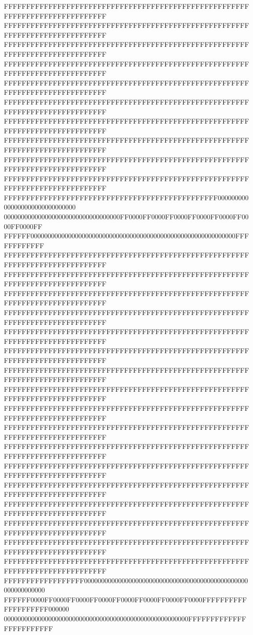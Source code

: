 FFFFFFFFFFFFFFFFFFFFFFFFFFFFFFFFFFFFFFFFFFFFFFFFFFFFFFFFFFFFFFFFFFFFFFFFFFFFFF
FFFFFFFFFFFFFFFFFFFFFFFFFFFFFFFFFFFFFFFFFFFFFFFFFFFFFFFFFFFFFFFFFFFFFFFFFFFFFF
FFFFFFFFFFFFFFFFFFFFFFFFFFFFFFFFFFFFFFFFFFFFFFFFFFFFFFFFFFFFFFFFFFFFFFFFFFFFFF
FFFFFFFFFFFFFFFFFFFFFFFFFFFFFFFFFFFFFFFFFFFFFFFFFFFFFFFFFFFFFFFFFFFFFFFFFFFFFF
FFFFFFFFFFFFFFFFFFFFFFFFFFFFFFFFFFFFFFFFFFFFFFFFFFFFFFFFFFFFFFFFFFFFFFFFFFFFFF
FFFFFFFFFFFFFFFFFFFFFFFFFFFFFFFFFFFFFFFFFFFFFFFFFFFFFFFFFFFFFFFFFFFFFFFFFFFFFF
FFFFFFFFFFFFFFFFFFFFFFFFFFFFFFFFFFFFFFFFFFFFFFFFFFFFFFFFFFFFFFFFFFFFFFFFFFFFFF
FFFFFFFFFFFFFFFFFFFFFFFFFFFFFFFFFFFFFFFFFFFFFFFFFFFFFFFFFFFFFFFFFFFFFFFFFFFFFF
FFFFFFFFFFFFFFFFFFFFFFFFFFFFFFFFFFFFFFFFFFFFFFFFFFFFFFFFFFFFFFFFFFFFFFFFFFFFFF
FFFFFFFFFFFFFFFFFFFFFFFFFFFFFFFFFFFFFFFFFFFFFFFFFFFFFFFFFFFFFFFFFFFFFFFFFFFFFF
FFFFFFFFFFFFFFFFFFFFFFFFFFFFFFFFFFFFFFFFFFFFFFFF000000000000000000000000000000
0000000000000000000000000000000000FF0000FF0000FF0000FF0000FF0000FF0000FF0000FF
FFFFFF000000000000000000000000000000000000000000000000000000000000FFFFFFFFFFFF
FFFFFFFFFFFFFFFFFFFFFFFFFFFFFFFFFFFFFFFFFFFFFFFFFFFFFFFFFFFFFFFFFFFFFFFFFFFFFF
FFFFFFFFFFFFFFFFFFFFFFFFFFFFFFFFFFFFFFFFFFFFFFFFFFFFFFFFFFFFFFFFFFFFFFFFFFFFFF
FFFFFFFFFFFFFFFFFFFFFFFFFFFFFFFFFFFFFFFFFFFFFFFFFFFFFFFFFFFFFFFFFFFFFFFFFFFFFF
FFFFFFFFFFFFFFFFFFFFFFFFFFFFFFFFFFFFFFFFFFFFFFFFFFFFFFFFFFFFFFFFFFFFFFFFFFFFFF
FFFFFFFFFFFFFFFFFFFFFFFFFFFFFFFFFFFFFFFFFFFFFFFFFFFFFFFFFFFFFFFFFFFFFFFFFFFFFF
FFFFFFFFFFFFFFFFFFFFFFFFFFFFFFFFFFFFFFFFFFFFFFFFFFFFFFFFFFFFFFFFFFFFFFFFFFFFFF
FFFFFFFFFFFFFFFFFFFFFFFFFFFFFFFFFFFFFFFFFFFFFFFFFFFFFFFFFFFFFFFFFFFFFFFFFFFFFF
FFFFFFFFFFFFFFFFFFFFFFFFFFFFFFFFFFFFFFFFFFFFFFFFFFFFFFFFFFFFFFFFFFFFFFFFFFFFFF
FFFFFFFFFFFFFFFFFFFFFFFFFFFFFFFFFFFFFFFFFFFFFFFFFFFFFFFFFFFFFFFFFFFFFFFFFFFFFF
FFFFFFFFFFFFFFFFFFFFFFFFFFFFFFFFFFFFFFFFFFFFFFFFFFFFFFFFFFFFFFFFFFFFFFFFFFFFFF
FFFFFFFFFFFFFFFFFFFFFFFFFFFFFFFFFFFFFFFFFFFFFFFFFFFFFFFFFFFFFFFFFFFFFFFFFFFFFF
FFFFFFFFFFFFFFFFFFFFFFFFFFFFFFFFFFFFFFFFFFFFFFFFFFFFFFFFFFFFFFFFFFFFFFFFFFFFFF
FFFFFFFFFFFFFFFFFFFFFFFFFFFFFFFFFFFFFFFFFFFFFFFFFFFFFFFFFFFFFFFFFFFFFFFFFFFFFF
FFFFFFFFFFFFFFFFFFFFFFFFFFFFFFFFFFFFFFFFFFFFFFFFFFFFFFFFFFFFFFFFFFFFFFFFFFFFFF
FFFFFFFFFFFFFFFFFFFFFFFFFFFFFFFFFFFFFFFFFFFFFFFFFFFFFFFFFFFFFFFFFFFFFFFFFFFFFF
FFFFFFFFFFFFFFFFFFFFFFFFFFFFFFFFFFFFFFFFFFFFFFFFFFFFFFFFFFFFFFFFFFFFFFFFFFFFFF
FFFFFFFFFFFFFFFFFFFFFFFFFFFFFFFFFFFFFFFFFFFFFFFFFFFFFFFFFFFFFFFFFFFFFFFFFFFFFF
FFFFFFFFFFFFFFFFFF000000000000000000000000000000000000000000000000000000000000
FFFFFF0000FF0000FF0000FF0000FF0000FF0000FF0000FF0000FFFFFFFFFFFFFFFFFFFF000000
000000000000000000000000000000000000000000000000000000FFFFFFFFFFFFFFFFFFFFFFFF
